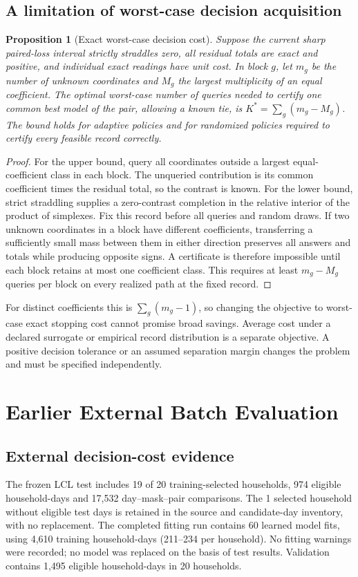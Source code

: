 \documentclass[12pt]{article}
\newtheorem{proposition}{Proposition}
\begin{document}
\subsection{A limitation of worst-case decision acquisition}
\label{app:decision-worstcase}
\begin{proposition}[Exact worst-case decision cost]
\label{prop:decision-worstcase}
Suppose the current sharp paired-loss interval strictly straddles zero,
all residual totals are exact and positive, and individual exact readings
have unit cost. In block $g$, let $m_g$ be the number of unknown coordinates
and $M_g$ the largest multiplicity of an equal coefficient.
The optimal worst-case number of queries needed to certify one common
best model of the pair, allowing a known tie, is
$K^*=\sum_g(m_g-M_g)$. The bound holds for adaptive policies and for
randomized policies required to certify every feasible record correctly.
\end{proposition}
\begin{proof}
For the upper bound, query all coordinates outside a largest
equal-coefficient class in each block. The unqueried contribution is
its common coefficient times the residual total, so the contrast is known.
For the lower bound, strict straddling supplies a zero-contrast completion
in the relative interior of the product of simplexes. Fix this record
before all queries and random draws. If two unknown coordinates in a
block have different coefficients, transferring a sufficiently small mass
between them in either direction preserves all answers and totals while
producing opposite signs. A certificate is therefore impossible until
each block retains at most one coefficient class. This requires at least
$m_g-M_g$ queries per block on every realized path at the fixed record.
\end{proof}
For distinct coefficients this is $\sum_g(m_g-1)$, so changing the
objective to worst-case exact stopping cost cannot promise broad savings.
Average cost under a declared surrogate or empirical record distribution
is a separate objective. A positive decision tolerance or an assumed
separation margin changes the problem and must be specified independently.

\section{Earlier External Batch Evaluation}\label{app:external-batch-results}
\subsection{External decision-cost evidence}\label{sec:external-results}
The frozen LCL test includes 19 of 20 training-selected households, 974 eligible household-days and 17,532 day--mask--pair comparisons. The 1 selected household without eligible test days is retained in the source and candidate-day inventory, with no replacement. The completed fitting run contains 60 learned model fits, using 4,610 training household-days (211--234 per household). No fitting warnings were recorded; no model was replaced on the basis of test results. Validation contains 1,495 eligible household-days in 20 households.
\end{document}
